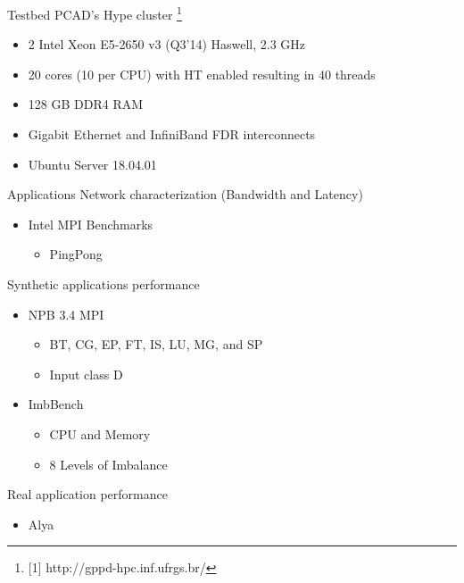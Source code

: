 \documentclass{beamer}
\begin{document}
\begin{frame}{Testbed}
PCAD's Hype cluster \footnote{[1] http://gppd-hpc.inf.ufrgs.br/}
\begin{itemize}
\item 2 \texttimes{} Intel Xeon E5-2650 v3 (Q3'14) Haswell, 2.3 GHz
\item 20 cores (10 per CPU) with HT enabled resulting in 40 threads
\item 128 GB DDR4 RAM
\item Gigabit Ethernet and InfiniBand FDR interconnects
\item Ubuntu Server 18.04.01
\vfill
\end{itemize}
\vfill
\end{frame}

\begin{frame}{Applications}
Network characterization (Bandwidth and Latency)
    \begin{itemize}
        \item Intel MPI Benchmarks 
        \begin{itemize}
            \item PingPong
        \end{itemize}
    \end{itemize}
    \pause \vfill
Synthetic applications performance
    \begin{itemize}
        \item NPB 3.4 MPI
        \begin{itemize}
            \item BT, CG, EP, FT, IS, LU, MG, and SP
            \item Input class D
        \pause \vfill
        \end{itemize}
        \item ImbBench 
        \begin{itemize}
            \item CPU and Memory
            \item 8 Levels of Imbalance
        \end{itemize}
        \end{itemize}
        \pause \vfill
Real application performance
    \begin{itemize}
        \item Alya
    \end{itemize}
\end{frame}
\end{document}
